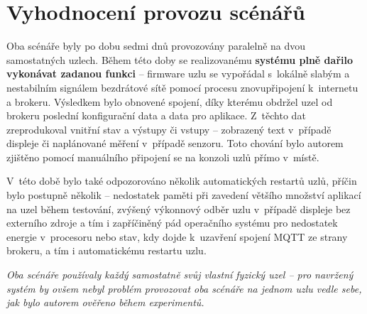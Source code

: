 \section{Vyhodnocení provozu scénářů}\label{sec:vyhodnocení}

Oba scénáře byly po dobu sedmi dnů provozovány paralelně na dvou samostatných uzlech.
Během této doby se realizovanému \textbf{systému plně dařilo vykonávat zadanou funkci} -- firmware uzlu se vypořádal
s~lokálně slabým a nestabilním signálem bezdrátové sítě pomocí procesu znovupřipojení k~internetu a brokeru.
Výsledkem bylo obnovené spojení, díky kterému obdržel uzel od brokeru poslední konfigurační data a data pro
aplikace.
Z~těchto dat zreprodukoval vnitřní stav a výstupy či vstupy -- zobrazený text v~případě displeje či naplánované měření
v~případě senzoru.
Toto chování bylo autorem zjištěno pomocí manuálního připojení se na konzoli uzlů přímo v~místě.

V~této době bylo také odpozorováno několik automatických restartů uzlů, příčin bylo postupně několik -- nedostatek
paměti při zavedení většího množství aplikací na uzel během testování, zvýšený výkonnový odběr uzlu v~případě
displeje bez externího zdroje a tím i zapříčiněný pád operačního systému pro nedostatek energie v~procesoru nebo
stav, kdy dojde k~uzavření spojení MQTT ze strany brokeru, a tím i automatickému restartu uzlu.

\textit{Oba scénáře používaly každý samostatně svůj vlastní fyzický uzel -- pro navržený systém by ovšem nebyl
problém provozovat oba scénáře na jednom uzlu vedle sebe, jak bylo autorem ověřeno během experimentů.}